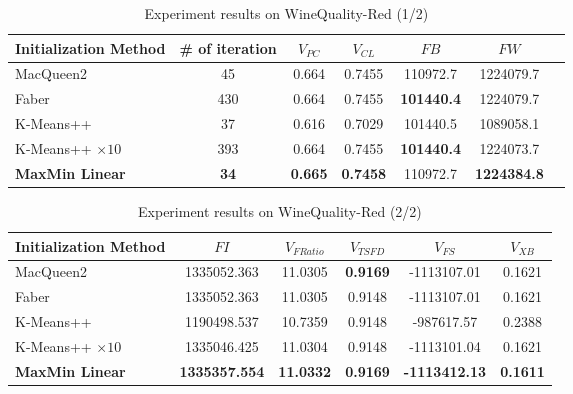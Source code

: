 \documentclass[runningheads,a4paper]{llncs}
\begin{document}
\begin{table*}
\centering
\caption{Experiment results on WineQuality-Red (1/2)}
\label{tab:ComparisonWineQuality}
\begin{tabular}{|l|c|c|c|c|c|c|}
\hline
Initialization Method & \# of iteration & $V_{PC}$ & $V_{CL}$ & $FB$ & $FW$ \\ \hline
MacQueen2 & 45 & 0.664 & 0.7455 & 110972.7 & 1224079.7 \\ \hline
Faber & 430 & 0.664 & 0.7455 & \textbf{101440.4} & 1224079.7 \\ \hline
K-Means++ & 37 & 0.616 & 0.7029 & 101440.5 & 1089058.1 \\ \hline
K-Means++ $\times 10$ & 393 & 0.664 & 0.7455 & \textbf{101440.4} & 1224073.7 \\ \hline
\textbf{MaxMin Linear} & \textbf{34} & \textbf{0.665} & \textbf{0.7458} & 110972.7 & \textbf{1224384.8} \\ \hline
\end{tabular}
\end{table*}


\begin{table*}
\centering
\caption{Experiment results on WineQuality-Red (2/2)}
\label{tab:ComparisonWineQuality2}
\begin{tabular}{|l|c|c|c|c|c|}
\hline
Initialization Method & $FI$ & $V_{FRatio}$ & $V_{TSFD}$ & $V_{FS}$ & $V_{XB}$ \\ \hline
MacQueen2 & 1335052.363 & 11.0305 & \textbf{0.9169} & -1113107.01 & 0.1621 \\ \hline
Faber & 1335052.363 & 11.0305 & 0.9148 & -1113107.01 & 0.1621 \\ \hline
K-Means++ & 1190498.537 & 10.7359 & 0.9148 & -987617.57 & 0.2388 \\ \hline
K-Means++ $\times 10$ & 1335046.425 & 11.0304 & 0.9148 & -1113101.04 & 0.1621 \\ \hline
\textbf{MaxMin Linear} & \textbf{1335357.554} & \textbf{11.0332} & \textbf{0.9169} & \textbf{-1113412.13} & \textbf{0.1611} \\ \hline
\end{tabular}
\end{table*}
\end{document}
